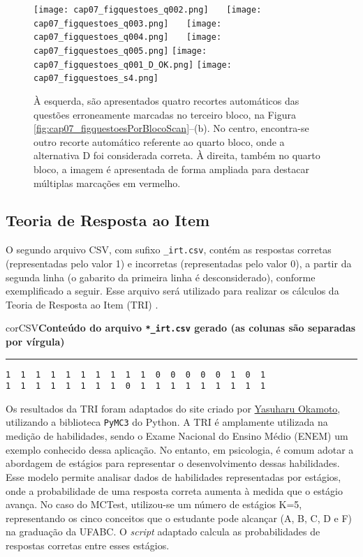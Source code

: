 \begin{figure}[!ht]
\centering
\texttt{[image: cap07\_figquestoes\_q002.png]} \ \ \ 
\texttt{[image: cap07\_figquestoes\_q003.png]} \ \ \ 
\texttt{[image: cap07\_figquestoes\_q004.png]} \ \ \ 
\texttt{[image: cap07\_figquestoes\_q005.png]} \hspace{11mm} 
\texttt{[image: cap07\_figquestoes\_q001\_D\_OK.png]} \hspace{11mm} 
\texttt{[image: cap07\_figquestoes\_s4.png]} \ \ \ 
\caption{À esquerda, são apresentados quatro recortes automáticos das questões erroneamente marcadas no terceiro bloco, na Figura \ref{fig:cap07_figquestoesPorBlocoScan}--(b). No centro, encontra-se outro recorte automático referente ao quarto bloco, onde a alternativa D foi considerada correta. À direita, também no quarto bloco, a imagem é apresentada de forma ampliada para destacar múltiplas marcações em vermelho.}
\label{fig:cap07_figquestoesPorBlocoScanErros}
\end{figure}

\subsection{Teoria de Resposta ao Item}

O segundo arquivo CSV, com sufixo \verb|_irt.csv|, contém as respostas corretas (representadas pelo valor 1) e incorretas (representadas pelo valor 0), a partir da segunda linha (o gabarito da primeira linha é desconsiderado), conforme exemplificado a seguir. Esse arquivo será utilizado para realizar os cálculos da Teoria de Resposta ao Item (TRI) \cite{birnbaum1968some}.

\begin{myboxCode}{corCSV}{\textbf{Conteúdo do arquivo \texttt{*\_irt.csv} gerado (as colunas são separadas por vírgula)}}\vspace{3mm}
\hrule
{\footnotesize
\begin{verbatim}
1  1  1  1  1  1  1  1  1  1  0  0  0  0  0  1  0  1
1  1  1  1  1  1  1  1  0  1  1  1  1  1  1  1  1  1
\end{verbatim}
}
\end{myboxCode}

Os resultados da TRI foram adaptados do site criado por \href{http://y-okamoto-psy1949.la.coocan.jp/Python/en1/IRTLClassPyMC3/}{Yasuharu Okamoto}, utilizando a biblioteca \verb|PyMC3| do Python. A TRI é amplamente utilizada na medição de habilidades, sendo o Exame Nacional do Ensino Médio (ENEM) um exemplo conhecido dessa aplicação. No entanto, em psicologia, é comum adotar a abordagem de estágios para representar o desenvolvimento dessas habilidades. Esse modelo permite analisar dados de habilidades representadas por estágios, onde a probabilidade de uma resposta correta aumenta à medida que o estágio avança. No caso do MCTest, utilizou-se um número de estágios K=5, representando os cinco conceitos que o estudante pode alcançar (A, B, C, D e F) na graduação da UFABC. O \textit{script} adaptado calcula as probabilidades de respostas corretas entre esses estágios.

